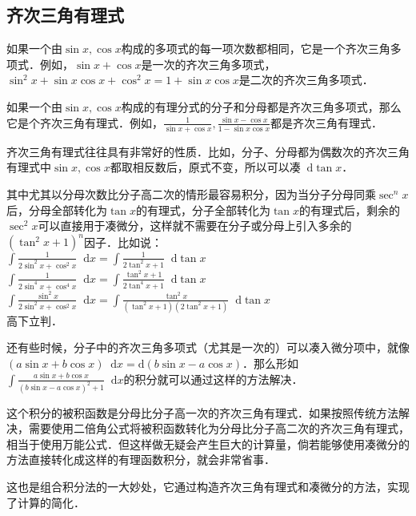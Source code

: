 \documentclass{ctexbook}
\newcommand*{\dif}{\mathop{}\!\mathrm{d}}
\begin{document}
\subsection{齐次三角有理式}
如果一个由$\sin{x},\cos{x}$构成的多项式的每一项次数都相同，它是一个齐次三角多项式．例如，$\sin{x}+\cos{x}$是一次的齐次三角多项式，$\sin^{2}{x}+\sin{x}\cos{x}+\cos^{2}{x}=1+\sin{x}\cos{x}$是二次的齐次三角多项式．\par
如果一个由$\sin{x},\cos{x}$构成的有理分式的分子和分母都是齐次三角多项式，那么它是个齐次三角有理式．例如，$\frac{1}{\sin{x}+\cos{x}},\frac{\sin{x}-\cos{x}}{1-\sin{x}\cos{x}}$都是齐次三角有理式．\par
齐次三角有理式往往具有非常好的性质．比如，分子、分母都为偶数次的齐次三角有理式中$\sin{x},\cos{x}$都取相反数后，原式不变，所以可以凑$\dif{\tan{x}}$．\par
其中尤其以分母次数比分子高二次的情形最容易积分，因为当分子分母同乘$\sec^{n}{x}$后，分母全部转化为$\tan{x}$的有理式，分子全部转化为$\tan{x}$的有理式后，剩余的$\sec^{2}{x}$可以直接用于凑微分，这样就不需要在分子或分母上引入多余的$\left(\tan^{2}{x}+1\right)^{n}$因子．比如说：\\
$\int\frac{1}{2\sin^{2}{x}+\cos^{2}{x}}\dif{x}=\int\frac{1}{2\tan^{2}{x}+1}\dif{\tan{x}}$\\
$\int\frac{1}{2\sin^{4}{x}+\cos^{4}{x}}\dif{x}=\int\frac{\tan^{2}{x}+1}{2\tan^{4}{x}+1}\dif{\tan{x}}$\\
$\int\frac{\sin^{2}{x}}{2\sin^{2}{x}+\cos^{2}{x}}\dif{x}=\int\frac{\tan^{2}{x}}{\left(\tan^{2}{x}+1\right)\left(2\tan^{2}{x}+1\right)}\dif{\tan{x}}$\\
高下立判．\par
还有些时候，分子中的齐次三角多项式（尤其是一次的）可以凑入微分项中，就像$\left(a\sin{x}+b\cos{x}\right)\dif{x}=\mathrm{d}\left(b\sin{x}-a\cos{x}\right)$．那么形如$\int\frac{a\sin{x}+b\cos{x}}{\left(b\sin{x}-a\cos{x}\right)^{2}+1}\dif{x}$的积分就可以通过这样的方法解决．\par
这个积分的被积函数是分母比分子高一次的齐次三角有理式．如果按照传统方法解决，需要使用二倍角公式将被积函数转化为分母比分子高二次的齐次三角有理式，相当于使用万能公式．但这样做无疑会产生巨大的计算量，倘若能够使用凑微分的方法直接转化成这样的有理函数积分，就会非常省事．\par
这也是组合积分法的一大妙处，它通过构造齐次三角有理式和凑微分的方法，实现了计算的简化．\par
\end{document}
